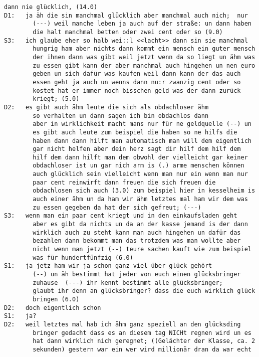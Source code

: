 \begin{lstlisting}[language={}]
        dann nie glücklich, (14.0)
D1:   ja äh die sin manchmal glücklich aber manchmal auch nich;  nur 
        (---) weil manche leben ja auch auf der straße: un dann haben 
        die halt manchmal betten oder zwei cent oder so (9.0)
S3:   ich glaube eher so halb wei::l <<lacht>> dann sin sie manchmal 
        hungrig ham aber nichts dann kommt ein mensch ein guter mensch 
        der ihnen dann was gibt weil jetzt wenn da so liegt un ähm was 
        zu essen gibt kann der aber manchmal auch hingehen un nen euro 
        geben un sich dafür was kaufen weil dann kann der das auch 
        essen geht ja auch un wenns dann nu:r zwanzig cent oder so  
        kostet hat er immer noch bisschen geld was der dann zurück  
        kriegt; (5.0)
D2:   es gibt auch ähm leute die sich als obdachloser ähm 
        so verhalten un dann sagen ich bin obdachlos dann
        aber in wirklichkeit macht mans nur für ne geldquelle (--) un 
        es gibt auch leute zum beispiel die haben so ne hilfs die 
        haben dann dann hilft man automatisch man will dem eigentlich 
        gar nicht helfen aber dein herz sagt dir hilf dem hilf dem 
        hilf dem dann hilft man dem obwohl der vielleicht gar keiner 
        obdachloser ist un gar nich arm is (.) arme menschen können 
        auch glücklich sein vielleicht wenn man nur ein wenn man nur 
        paar cent reinwirft dann freuen die sich freuen die 
        obdachlosen sich auch (3.0) zum beispiel hier in kesselheim is 
        auch einer ähm un da ham wir ähm letztes mal ham wir dem was 
        zu essen gegeben da hat der sich gefreut; (---)
S3:   wenn man ein paar cent kriegt und in den einkaufsladen geht 
        aber es gibt da nichts un da an der kasse jemand is der dann 
        wirklich auch zu steht kann man auch hingehen un dafür das 
        bezahlen dann bekommt man das trotzdem was man wollte aber 
        nicht wenn man jetzt (--) teure sachen kauft wie zum beispiel 
        was für hundertfünfzig (6.0)
S1:   ja jetz ham wir ja schon ganz viel über glück gehört 
        (--) un äh bestimmt hat jeder von euch einen glücksbringer      
        zuhause  (---) ihr kennt bestimmt alle glücksbringer; 
        glaubt ihr denn an glücksbringer? dass die euch wirklich glück 
        bringen (6.0)
D2:   doch eigentlich schon
S1:   ja?
D2:   weil letztes mal hab ich ähm ganz speziell an den glücksding  
        bringer gedacht dass es an diesem tag NICHt regnen wird un es 
        hat dann wirklich nich geregnet; ((Gelächter der Klasse, ca. 2 
        sekunden) gestern war ein wer wird millionär dran da war echt 

\end{lstlisting}

